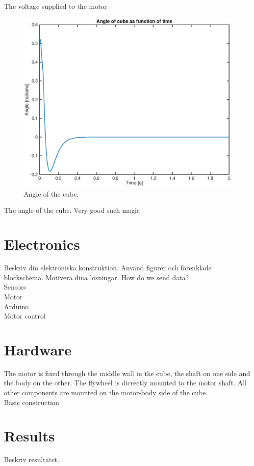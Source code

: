 \documentclass[a4paper,11pt]{kth-mag}
\begin{document}
The voltage supplied to the motor

\begin{figure}[!htb]
\centering
\includegraphics[scale=.7]{angleplot.eps}
\caption{Angle of the cube.}
\label{fig:voltageplot}
\end{figure}

The angle of the cube. Very good such magic


\section{Electronics}
Beskriv din elektroniska konstruktion. Använd figurer och förenklade blockschema. Motivera dina lösningar.
How do we send data?
\\ Sensors
\\ Motor
\\ Arduino
\\ Motor control


\section{Hardware}
The motor is fixed through the middle wall in the cube, the shaft on one side and the body on the other. The flywheel is dicrectly mounted to the motor shaft. All other components are mounted on the motor-body side of the cube.
\\ Basic construction

\section{Results}
Beskriv resultatet.
\end{document}
